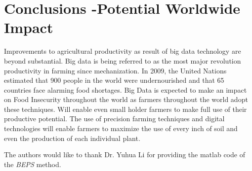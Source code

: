 \documentclass[sigconf]{acmart}
\begin{document}
\section{Conclusions -Potential Worldwide Impact}

Improvements to agricultural productivity as result of big data technology are beyond substantial. Big data is being referred to as the most major revolution productivity in farming since mechanization.  In 2009, the United Nations estimated that 900 people in the world were undernourished and that 65 countries face alarming food shortages. Big Data is expected to make an impact on Food Insecurity throughout the world as farmers throughout the world adopt these techniques. Will enable even small holder farmers to make full use of their productive potential. The use of precision farming techniques and digital technologies will enable farmers to maximize the use of every inch of soil and even the production of each individual plant.


\begin{acks}

  The authors would like to thank Dr. Yuhua Li for providing the
  matlab code of the \textit{BEPS} method.

\end{acks}


 
\end{document}
